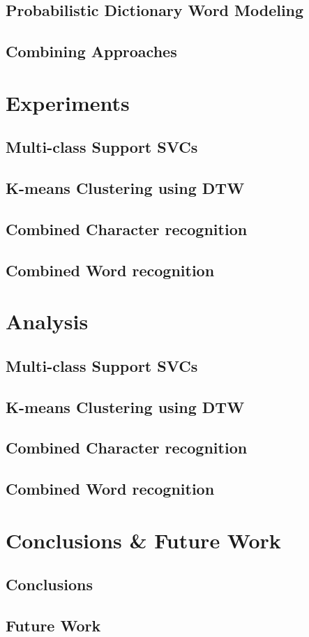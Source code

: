 \documentclass[12pt]{article}
\begin{document}
	\subsection{Probabilistic Dictionary Word Modeling }
	\subsection{Combining Approaches}
	
\section{Experiments}
	\subsection{Multi-class Support SVCs}
	\subsection{K-means Clustering using DTW}
	\subsection{Combined Character recognition}
	\subsection{Combined Word recognition}

\section{Analysis}
	\subsection{Multi-class Support SVCs}
	\subsection{K-means Clustering using DTW}
	\subsection{Combined Character recognition}
	\subsection{Combined Word recognition}
	
\section{Conclusions \& Future Work}
	\subsection{Conclusions}
	\subsection{Future Work}


	

\end{document}
